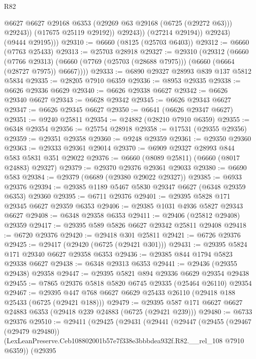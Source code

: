 \begin{lexlean}{R82}
\begin{coremodule}
                      @6627
                      @6627
                      @29168
                      @6353
                      (@29269 @63 @29168 (@6725 (@29272 @63)))
                      @29243))
                  (@17675 @25119 @29192))
                @29243))
            (@27214 @29194))
          @29243)
        (@9444 @29195)))
@29310 := @6660 (@8125 (@25703 @6403))
@29312 := @6660 (@7763 @25433)
@29313 := @25703 @28918
@29327 := @29310
    (@29312
      (@6660
        (@7766 @29313)
        (@6660 (@7769 (@25703 (@28688 @7975))) (@6660 (@6664 (@28727 @7975)) @6667))))
@29333 := @6890 @29327 @28993 @839 @137 @5812 @5834
@29335 := @28205 @7910 @6359
@29336 := @8953 @29335
@29338 := @6626 @29336 @6629
@29340 := @6626 @29338 @6627
@29342 := @6626 @29340 @6627
@29343 := @6628 @29342
@29345 := @6626 @29343 @6627
@29347 := @6626 @29345 @6627
@29350 := @6641 (@6626 @29347 @6627)
@29351 := @9240 @25811
@29354 := @24882 (@28210 @7910 @6359)
@29355 := @6348 @29354
@29356 := @25754 @28918
@29358 := @17531 (@29355 @29356)
@29359 := @29351 @29358
@29360 := @9248 @29359
@29361 := @29350 @29360
@29363 := @29333 @29361 @29014
@29370 := @6909 @29327 @28993 @844 @583 @5831 @351 @29022
@29376 := @6660 (@8089 @25811) (@6660 (@8017 @24883) @29327)
@29379 := @29370 @29376 @29361 @29033
@29380 := @6690 @583
@29384 := @29379 (@6689 (@29380 @29022 @29327))
@29385 := @6933 @29376
@29394 := @29385 @1189 @5467 @5830 @29347 @6627 (@6348 @29359 @6353) @29360
@29395 := @6711 @29376
@29401 := @29395 @5828 @171 @29345 @6627 @29359 @6353
@29406 := @29385 @1031 @4936 @5827 @29343 @6627
@29408 := @6348 @29358 @6353
@29411 := @29406 (@25812 @29408) @29359
@29417 := @29395 @589 @5826 @6627 @29342 @25811 @29408
@29418 := @6720 @29376
@29420 := @29418 @301 @25811
@29421 := @6726 @29376
@29425 := @29417 (@29420 (@6725 (@29421 @301)))
@29431 := @29395 @5824 @171 @29340 @6627 @29358 @6353
@29436 := @29385 @844 @1794 @5823 @29338 @6627
@29438 := @6348 @29313 @6353
@29441 := @29436 (@29355 @29438) @29358
@29447 := @29395 @5821 @894 @29336 @6629 @29354 @29438
@29455 := @7865 @29376 @5818 @5820 @6745 @29335 (@25464 @26110) @29354
@29467 := @29395 @447 @768 @6627 @6629 @25433 @26110 (@29418 @188 @25433 (@6725 (@29421 @188)))
@29479 := @29395 @587 @171 @6627 @6627 @24883 @6353 (@29418 @239 @24883 (@6725 (@29421 @239)))
@29480 := @6733 @29376
@29510 := @29411
    (@29425
      (@29431
        (@29441
          (@29447
            (@29455
              (@29467 (@29479 @29480))
              (LexLeanPreserve.Ceb108802001b57e7f338e3bbbdea932f.R82.__rel_108 @7910 @6359))
            (@29395

\end{coremodule}
\end{lexlean}

